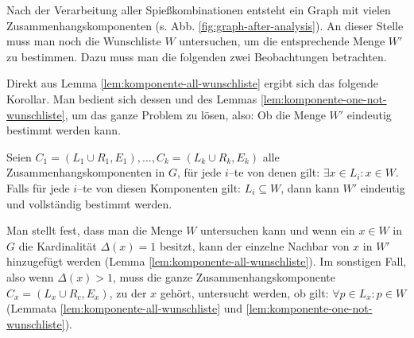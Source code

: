 \begin{comment}
\begin{lemma}\label{lem:grad-groesser1}
Seien $x \in A$ ein Knoten in $G$ und seine Kardinalität $\Delta(x) = k > 1$.
Dann gehört $x$ zu einer Zusammenhangskomponente $C = (V_c, E_c)$, wobei
die Menge $V_c$ aus insgesamt $2k$ Knoten $x_1, ..., x_k \in A$ 
und $y_1, ..., y_k \in B$ besteht. Für die Menge $E_c$ gilt:
$E_c = (A \setminus V_c) \times (B \setminus V_c) $.
$C$ ist deshalb selbt ein vollständiger, bipartiter Graph.
\end{lemma}
\begin{proof}
Der Beweis erfolgt durch Widerspruch.
\TODO{Beweis} 
\end{proof}
\end{comment}




Nach der Verarbeitung aller Spießkombinationen entsteht ein Graph mit vielen Zusammenhangskomponenten
(s. Abb. \ref{fig:graph-after-analysis}).
An dieser Stelle muss man noch die Wunschliste $W$ untersuchen, um die entsprechende Menge $W'$ zu bestimmen.
Dazu muss man die folgenden zwei Beobachtungen betrachten.





Direkt aus Lemma \ref{lem:komponente-all-wunschliste} ergibt sich das folgende Korollar.
Man bedient sich dessen und des Lemmas \ref{lem:komponente-one-not-wunschliste}, um das ganze Problem zu lösen, also: Ob die Menge $W'$ eindeutig bestimmt werden kann.

\begin{korollar}
Seien $C_1 = (L_1 \cup R_1, E_1), ..., C_k = (L_k \cup R_k, E_k)$ alle Zusammenhangskomponenten in $G$,
für jede $i$--te von denen gilt: $\exists x \in L_i : x \in W$.
Falls für jede $i$--te von diesen Komponenten gilt: $L_i \subseteq W$, dann
kann $W'$ eindeutig und vollständig bestimmt werden.
\end{korollar}

Man stellt fest, dass man die Menge $W$ untersuchen kann und wenn ein $x \in W$ in $G$ die
Kardinalität $\Delta(x) = 1$ besitzt, kann der einzelne Nachbar von $x$ in $W'$ hinzugefügt werden
(Lemma \ref{lem:komponente-all-wunschliste}).
Im sonstigen Fall, also wenn $\Delta(x) > 1$, muss die ganze Zusammenhangskomponente
$C_x = (L_x \cup R_c, E_x)$, zu der $x$ gehört, untersucht werden, ob gilt: $\forall p \in L_x: p \in W$
(Lemmata \ref{lem:komponente-all-wunschliste} und \ref{lem:komponente-one-not-wunschliste}).\\

